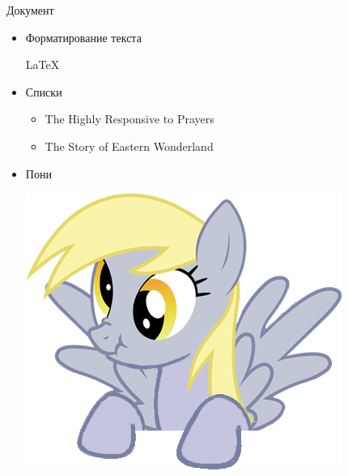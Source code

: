 \begin{frame}[fragile]{Документ}
  \begin{itemize}
    \item Форматирование текста
      \begin{latexcode}
        \Large \LaTeX
      \end{latexcode}
    \pause
    \item Списки
      \begin{latexcode}
        \begin{itemize}
          \item The Highly Responsive to Prayers
          \item The Story of Eastern Wonderland
        \end{itemize}
      \end{latexcode}      
    \pause
    \item Пони
      \begin{latexcode}
        \includegraphics[scale=0.1]{img/Derpy_hooves}
      \end{latexcode}
  \end{itemize}
\end{frame}

